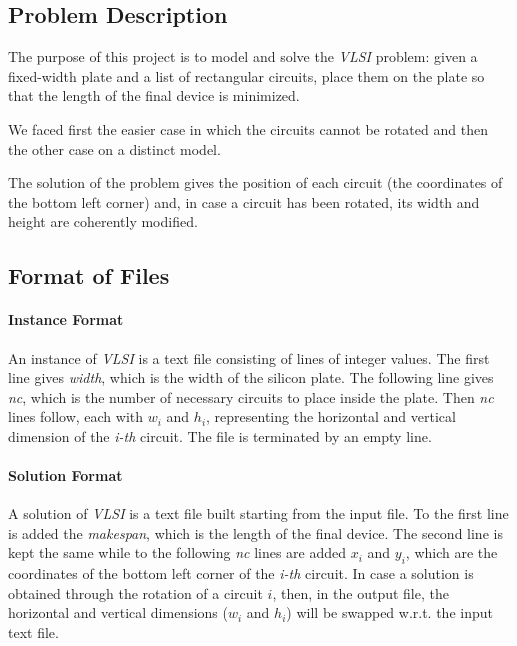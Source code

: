 \subsection{Problem Description} 
    The purpose of this project is to model and solve the \textit{VLSI} problem: given a fixed-width plate and a list of 
    rectangular circuits, place them on the plate so that the length of the final device is minimized. 
    
    We faced first the easier case in which the circuits cannot be rotated and then the other case on a distinct model.

    The solution of the problem gives the position of each circuit (the coordinates of the bottom left corner) and,
    in case a circuit has been rotated, its width and height are coherently modified.


\subsection{Format of Files}
    \paragraph*{Instance Format}
        An instance of \textit{VLSI} is a text file consisting of lines of integer values. The first line gives \textit{width}, 
        which is the width of the silicon plate. The following line gives \textit{nc}, which is the number of necessary circuits 
        to place inside the plate. Then \textit{nc} lines follow, each with $w_i$ and $h_i$, representing the horizontal and 
        vertical dimension of the \textit{i-th} circuit. The file is terminated by an empty line.

    \paragraph*{Solution Format}
        A solution of \textit{VLSI} is a text file built starting from the input file. To the first line is added the \textit{makespan},
        which is the length of the final device. The second line is kept the same while to the following \textit{nc} lines are added
        $x_i$ and $y_i$, which are the coordinates of the bottom left corner of the \textit{i-th} circuit.
        In case a solution is obtained 
        through the rotation of a circuit $i$, then, in the output file, the horizontal and vertical dimensions ($w_i$ and $h_i$) 
        will be swapped w.r.t. the input text file.

